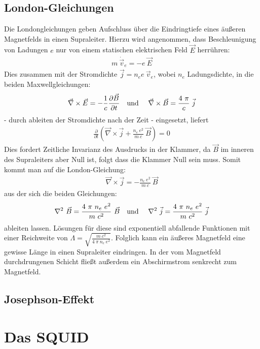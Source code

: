 \documentclass[12pt]{article}
\begin{document}
\subsection{London-Gleichungen}
\label{london}
Die Londongleichungen geben Aufschluss über die Eindringtiefe eines äußeren Magnetfelds in einen Supraleiter.
Hierzu wird angenommen, dass Beschleunigung von Ladungen $e$ nur von einem statischen elektrischen Feld $\vec E$ herrühren:
\begin{align}
 m~\dot{\vec{v}}_e = - e~ \vec E
\end{align}
Dies zusammen mit der Stromdichte $\vec j = n_e e~\vec v_e$, wobei $n_e$ Ladungsdichte, in die beiden Maxwellgleichungen:
\begin{align}
 \vec\nabla \times \vec E = - \frac{1}{c}\frac{\partial\vec B}{\partial t} \textnormal{\quad und \quad} 
 \vec\nabla \times \vec B =  \frac{4~\pi}{c}~\vec j
\end{align}
- durch ableiten der Stromdichte nach der Zeit - eingesetzt, liefert
\begin{align}
 \frac{\partial}{\partial t} \left( \vec\nabla\times\vec j +  \frac{n_e~e^2}{m~c}~\vec B\right) = 0
\end{align}
Dies fordert Zeitliche Invarianz des Ausdrucks in der Klammer, da $\vec B$ im inneren des Supraleiters aber Null ist, folgt dass die Klammer Null sein muss. Somit kommt man auf die London-Gleichung:
\begin{align}
 \vec\nabla\times\vec j = -\frac{n_e~e^2}{m~c}~\vec B
\end{align}
aus der sich die beiden Gleichungen:
\begin{align}
 \nabla^2~\vec B = \frac{4~\pi~n_e~e^2}{m~c^2}~\vec B \textnormal{\quad und \quad} \nabla^2~\vec j = \frac{4~\pi~n_e~e^2}{m~c^2}~\vec j
\end{align}
ableiten lassen. Lösungen für diese sind exponentiell abfallende Funktionen mit einer Reichweite von $\Lambda =\sqrt{\frac{m~c^2}{4~\pi~n_e~e^2}}$. Folglich kann ein äußeres Magnetfeld eine gewisse Länge in einen Supraleiter eindringen. In der vom Magnetfeld durchdrungenen Schicht fließt außerdem ein Abschirmstrom senkrecht zum Magnetfeld.

\subsection{Josephson-Effekt}

\section{Das SQUID}
\end{document}
